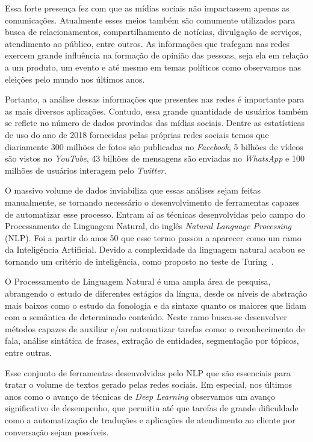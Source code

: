 Essa forte presença fez com que as mídias sociais não impactassem apenas as
comunicações.
Atualmente esses meios também são comumente utilizados para busca de
relacionamentos, compartilhamento de notícias, divulgação de serviços,
atendimento ao público, entre outros.
As informações que trafegam nas redes exercem grande influência na formação de
opinião das pessoas, seja ela em relação a um produto, um evento e até mesmo em
temas políticos como observamos nas eleições pelo mundo nos últimos anos.

Portanto, a análise dessas informações que presentes nas redes é importante para
as mais diversos aplicações.
Contudo, essa grande quantidade de usuários também se reflete no número de dados
provindos das mídias sociais.
Dentre as estatísticas de uso do ano de 2018 fornecidas pelas próprias redes
sociais temos que diariamente 300 milhões de fotos são publicadas no
\textit{Facebook}, 5 bilhões de vídeos são vistos no \textit{YouTube}, 43
bilhões de mensagens são enviadas no \textit{WhatsApp} e 100 milhões de usuários
interagem pelo \textit{Twitter}.

O massivo volume de dados inviabiliza que essas análises sejam feitas
manualmente, se tornando necessário o desenvolvimento de ferramentas capazes de
automatizar esse processo.
Entram aí as técnicas desenvolvidas pelo campo do Processamento de Linguagem
Natural, do inglês \textit{Natural Language Processing} (NLP).
Foi a partir do anos 50 que esse termo passou a aparecer como um ramo da
Inteligência Artificial.
Devido a complexidade da linguagem natural acabou se tornando um critério de
inteligência, como proposto no teste de Turing~\cite{turing50}.

O Processamento de Linguagem Natural é uma ampla área de pesquisa, abrangendo o
estudo de diferentes estágios da língua, desde os níveis de abstração mais
baixos como o estudo da fonologia e da sintaxe quanto os maiores que lidam com a
semântica de determinado conteúdo.
Neste ramo busca-se desenvolver métodos capazes de auxiliar e/ou automatizar
tarefas como: o reconhecimento de fala, análise sintática de frases, extração de
entidades, segmentação por tópicos, entre outras.

Esse conjunto de ferramentas desenvolvidas pelo NLP que são essenciais para
tratar o volume de textos gerado pelas redes sociais.
Em especial, nos últimos anos como o avanço de técnicas de \textit{Deep
Learning} observamos um avanço significativo de desempenho, que permitiu até que
tarefas de grande dificuldade como a automatização de traduções e aplicações de
atendimento ao cliente por conversação sejam possíveis.

